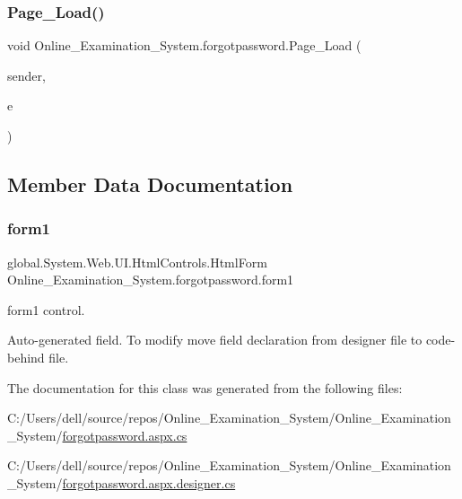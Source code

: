 \subsubsection{\texorpdfstring{Page\_Load()}{Page\_Load()}}
{\footnotesize\ttfamily void Online\+\_\+\+Examination\+\_\+\+System.\+forgotpassword.\+Page\+\_\+\+Load (\begin{DoxyParamCaption}\item[{object}]{sender,  }\item[{Event\+Args}]{e }\end{DoxyParamCaption})\hspace{0.3cm}{\ttfamily [protected]}}



\subsection{Member Data Documentation}
\mbox{\label{class_online___examination___system_1_1forgotpassword_afdbd2f24cb6b7a190f8193118738d20c}} 
\subsubsection{\texorpdfstring{form1}{form1}}
{\footnotesize\ttfamily global.\+System.\+Web.\+U\+I.\+Html\+Controls.\+Html\+Form Online\+\_\+\+Examination\+\_\+\+System.\+forgotpassword.\+form1\hspace{0.3cm}{\ttfamily [protected]}}



form1 control. 

Auto-\/generated field. To modify move field declaration from designer file to code-\/behind file. 

The documentation for this class was generated from the following files\+:\begin{DoxyCompactItemize}
\item 
C\+:/\+Users/dell/source/repos/\+Online\+\_\+\+Examination\+\_\+\+System/\+Online\+\_\+\+Examination\+\_\+\+System/\mbox{\hyperlink{forgotpassword_8aspx_8cs}{forgotpassword.\+aspx.\+cs}}\item 
C\+:/\+Users/dell/source/repos/\+Online\+\_\+\+Examination\+\_\+\+System/\+Online\+\_\+\+Examination\+\_\+\+System/\mbox{\hyperlink{forgotpassword_8aspx_8designer_8cs}{forgotpassword.\+aspx.\+designer.\+cs}}\end{DoxyCompactItemize}
